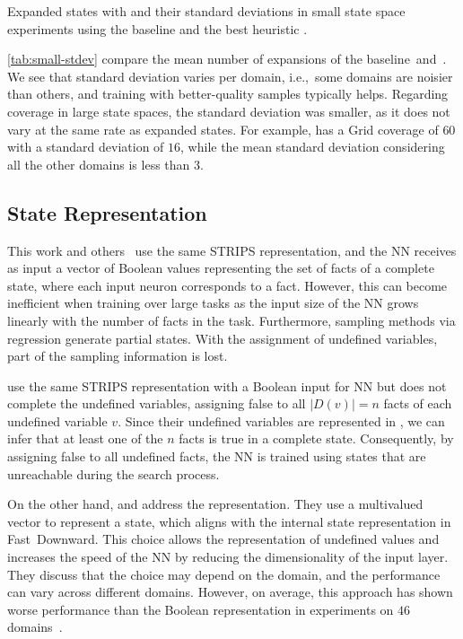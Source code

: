 \begin{table}[tb]
    \caption[Expanded states with standard deviations in small state space experiments.]{Expanded states with \gbfs and their standard deviations in small state space experiments using the baseline \hnnbase and the best heuristic \hnnrs.}
    \label{tab:small-stdev}
    \addmargin
    \centering
    
\end{table}

\cref{tab:small-stdev} compare the mean number of expansions of the baseline~\hnnbase and~\hnnrs. We see that standard deviation varies per domain, i.e.,~some domains are noisier than others, and training with better-quality samples typically helps. Regarding coverage in large state spaces, the standard deviation was smaller, as it does not vary at the same rate as expanded states. For example, \hnnrs has a Grid coverage of $60$ with a standard deviation of $16$, while the mean standard deviation considering all the other domains is less than $3$.

\subsection{State Representation}
\label{sec:limitation-representation}

This work and others~\cite{ferber2020neural, ferber2022neural, otoole2022sampling} use the same STRIPS representation, and the NN receives as input a vector of Boolean values representing the set of facts of a complete state, where each input neuron corresponds to a fact. However, this can become inefficient when training over large tasks as the input size of the NN grows linearly with the number of facts in the task. Furthermore, sampling methods via regression generate partial states. With the assignment of undefined variables, part of the sampling information is lost.

\citet{yu2020learning} use the same STRIPS representation with a Boolean input for NN but does not complete the undefined variables, assigning false to all $|D(v)|=n$ facts of each undefined variable $v$. Since their undefined variables are represented in \sas, we can infer that at least one of the $n$ facts is true in a complete state. Consequently, by assigning false to all undefined facts, the NN is trained using states that are unreachable during the search process.

On the other hand, \citet{yu2020learning} and \citet{geissmann2015learning} address the \sas representation. They use a multivalued vector to represent a state, which aligns with the internal state representation in Fast~Downward. This choice allows the representation of undefined values and increases the speed of the NN by reducing the dimensionality of the input layer. They discuss that the choice may depend on the domain, and the performance can vary across different domains. However, on average, this approach has shown worse performance than the Boolean representation in experiments on $46$ domains~\cite{yu2020learning}.
